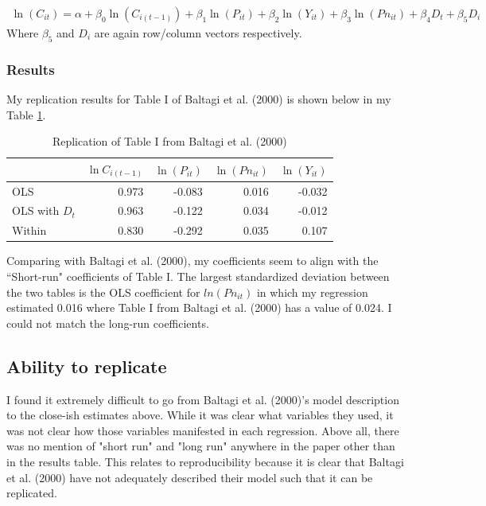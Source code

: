 \documentclass{article}
\begin{document}
\begin{align}
\ln(C_{it}) = \alpha + \beta_0\ln(C_{i(t-1)}) + \beta_1\ln(P_{it}) + 
		   \beta_2\ln(Y_{it}) + \beta_3\ln(Pn_{it}) + \beta_4 D_t + \beta_5 D_i
\end{align}
Where $\beta_5$ and $D_i$ are again row/column vectors respectively.

\subsubsection{Results}
My replication results for Table I of Baltagi et al. (2000) is shown below in my Table \ref{replication}.

\begin{table}[H]
\centering
\caption{Replication of Table I from Baltagi et al. (2000)}
\label{replication}
\begin{tabular}{@{}  l r r r r @{}}
& $\ln C_{i(t-1)}$ & $\ln(P_{it})$ & $\ln(Pn_{it})$ & $\ln(Y_{it})$  \\\midrule
OLS & 0.973 & -0.083 & 0.016 & -0.032 \\
OLS with $D_t$ & 0.963 & -0.122 & 0.034 & -0.012 \\
Within & 0.830 &  -0.292 & 0.035 & 0.107 \\
\bottomrule
\hline
\end{tabular}
\end{table}

Comparing with Baltagi et al. (2000), my coefficients seem to align with the ``Short-run" coefficients of Table I. The largest standardized deviation between the two tables is the OLS coefficient for $ln(Pn_{it})$ in which my regression estimated 0.016 where Table I from Baltagi et al. (2000) has a value of 0.024. I could not match the long-run coefficients.

\subsection{Ability to replicate}
I found it extremely difficult to go from Baltagi et al. (2000)'s model description to the close-ish estimates above. While it was clear what variables they used, it was not clear how those variables manifested in each regression. Above all, there was no mention of "short run" and "long run" anywhere in the paper other than in the results table. This relates to reproducibility because it is clear that Baltagi et al. (2000) have not adequately described their model such that it can be replicated.\\
\end{document}
